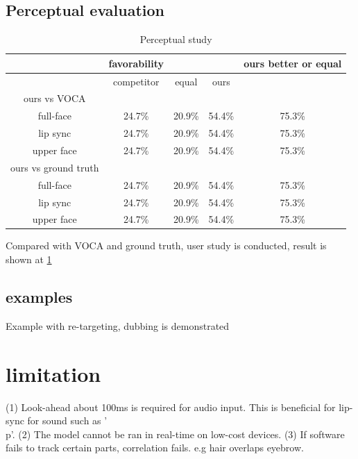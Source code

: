 \documentclass[10pt,twocolumn,letterpaper]{article}
\begin{document}
    \subsection{Perceptual evaluation}
    \begin{table}
      \begin{center}
        \begin{tabular}{c  c c c|c}
            \hline
               & favorability & & & ours better or equal \\
            \hline
              & competitor & equal & ours \\
            \hline
              ours vs VOCA\cite{Cudeiro_2019_CVPR} \\
              full-face & 24.7\% & 20.9\% & 54.4\% & 75.3\% \\
              lip sync & 24.7\% & 20.9\% & 54.4\% & 75.3\% \\
              upper face & 24.7\% & 20.9\% & 54.4\% & 75.3\% \\
            \hline
            ours vs ground truth \\
            full-face & 24.7\% & 20.9\% & 54.4\% & 75.3\% \\
            lip sync & 24.7\% & 20.9\% & 54.4\% & 75.3\% \\
            upper face & 24.7\% & 20.9\% & 54.4\% & 75.3\% \\
            \hline
        \end{tabular}
      \end{center}
      \caption{Perceptual study}
      \label{table:eval_favorability}
    \end{table}
      Compared with VOCA and ground truth, user study is conducted, result is shown at \ref{table:eval_favorability}
    \subsection{examples}
      Example with re-targeting, dubbing is demonstrated
    \section{limitation}
      (1) Look-ahead about 100ms is required for audio input. This is beneficial for lip-sync for sound such as '\\p'.
      (2) The model cannot be ran in real-time on low-cost devices. (3) If software fails to track certain parts, correlation fails. e.g hair overlaps eyebrow.
    

{
  \small
  
  
}
\end{document}
